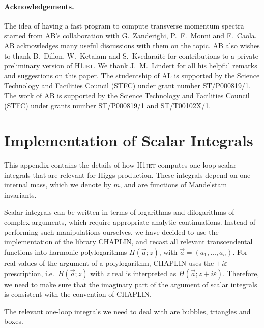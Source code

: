 \documentclass[12pt]{article}
\begin{document}
\paragraph{Acknowledgements.} The idea of having a fast program to
compute transverse momentum spectra started from AB's collaboration
with G.~Zanderighi, P.~F.~Monni and F.~Caola. AB
acknowledges many useful discussions with them on the topic. AB also
wishes to thank B.~Dillon, W.~Ketaiam and S.~Kvedarait\.e for contributions to a
private preliminary version of \textsc{H1jet}. We thank J.~M.~Lindert for all his 
helpful remarks and suggestions on this paper. The studentship of AL is
supported by the Science Technology and Facilities Council (STFC)
under grant number ST/P000819/1. The work of AB is supported by the
Science Technology and Facilities Council (STFC) under grants number
ST/P000819/1 and ST/T00102X/1.

\appendix

\section{Implementation of Scalar Integrals}
\label{sec:scalar-integrals}

This appendix contains the details of how \textsc{H1jet} computes one-loop
scalar integrals that are relevant for Higgs production. These
integrals depend on one internal mass, which we denote by $m$, and are
functions of Mandelstam
invariants.

Scalar integrals can be written in terms of logarithms and dilogarithms of complex
arguments, which require appropriate analytic continuations. Instead of performing such manipulations ourselves, we have
decided to use the implementation of the library CHAPLIN, and recast all relevant transcendental
functions into harmonic polylogarithms $H(\vec a;z)$, with
$\vec a=(a_1,\dots,a_n)$. For real values of the argument of a polylogarithm, CHAPLIN
uses the $+i\varepsilon$ prescription, i.e.\ $H(\vec a;z)$ with $z$
real is interpreted as $H(\vec a;z+i\varepsilon)$. Therefore, we need
to make sure that the imaginary part of the argument of scalar
integrals is consistent with the convention of CHAPLIN.

The relevant one-loop integrals we need to deal with are  
bubbles, triangles and boxes.
\end{document}
